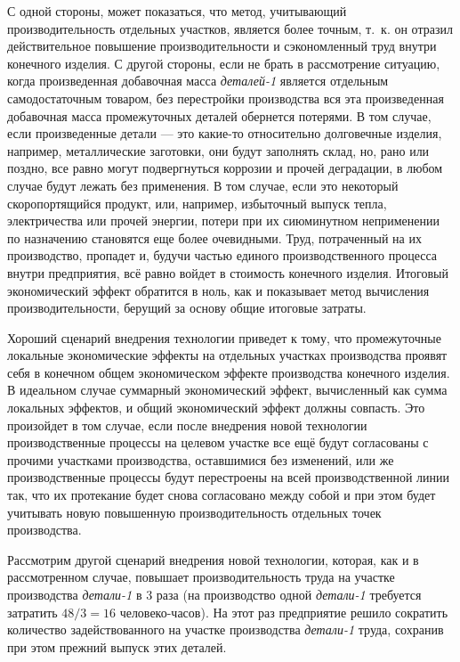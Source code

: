 \documentclass{article}
\let\textitorig\textit
\renewcommand{\textit}[1]{{\fontfamily{cmr}\selectfont \textitorig{#1}}}
\begin{document}
С одной стороны, может показаться, что метод, учитывающий производительность отдельных участков, является более точным, т.~к. он отразил действительное повышение производительности и сэкономленный труд внутри конечного изделия. С другой стороны, если не брать в рассмотрение ситуацию, когда произведенная добавочная масса \textit{деталей-1} является отдельным самодостаточным товаром, без перестройки производства вся эта произведенная добавочная масса промежуточных деталей обернется потерями. В том случае, если произведенные детали — это какие-то относительно долговечные изделия, например, металлические заготовки, они будут заполнять склад, но, рано или поздно, все равно могут подвергнуться коррозии и прочей деградации, в любом случае будут лежать без применения. В том случае, если это некоторый скоропортящийся продукт, или, например, избыточный выпуск тепла, электричества или прочей энергии, потери при их сиюминутном неприменении по назначению становятся еще более очевидными. Труд, потраченный на их производство, пропадет и, будучи частью единого производственного процесса внутри предприятия, всё равно войдет в стоимость конечного изделия. Итоговый экономический эффект обратится в ноль, как и показывает метод вычисления производительности, берущий за основу общие итоговые затраты.

Хороший сценарий внедрения технологии приведет к тому, что промежуточные локальные экономические эффекты на отдельных участках производства проявят себя в конечном общем экономическом эффекте производства конечного изделия. В идеальном случае суммарный экономический эффект, вычисленный как сумма локальных эффектов, и общий экономический эффект должны совпасть. Это произойдет в том случае, если после внедрения новой технологии производственные процессы на целевом участке все ещё будут согласованы с прочими участками производства, оставшимися без изменений, или же производственные процессы будут перестроены на всей производственной линии так, что их протекание будет снова согласовано между собой и при этом будет учитывать новую повышенную производительность отдельных точек производства.

Рассмотрим другой сценарий внедрения новой технологии, которая, как и в рассмотренном случае, повышает производительность труда на участке производства \textit{детали-1} в 3 раза (на производство одной \textit{детали-1} требуется затратить $48 / 3 = 16$ человеко-часов). На этот раз предприятие решило сократить количество задействованного на участке производства \textit{детали-1} труда, сохранив при этом прежний выпуск этих деталей. 
\end{document}
